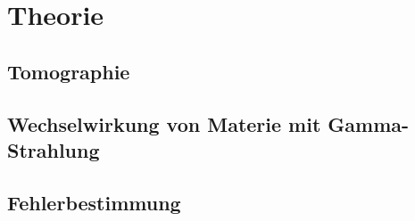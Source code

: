 \section{Theorie}
\subsection{Tomographie}

\subsection{Wechselwirkung von Materie mit Gamma-Strahlung}

\subsection{Fehlerbestimmung}